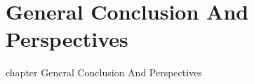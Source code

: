 

\chapter*{General Conclusion And Perspectives}  {chapter} {General Conclusion And Perspectives}

\ifpdf
    \graphicspath{{Chapter3/Figs/Raster/}{Chapter3/Figs/PDF/}{Chapter3/Figs/}}
\else
    \graphicspath{{Chapter3/Figs/Vector/}{Chapter3/Figs/}}
\fi

